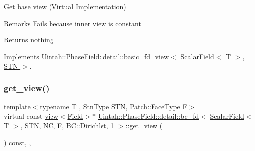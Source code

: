Get base view (Virtual \hyperlink{classUintah_1_1PhaseField_1_1Implementation}{Implementation}) 

\begin{DoxyRemark}{Remarks}
Fails because inner view is constant
\end{DoxyRemark}
\begin{DoxyReturn}{Returns}
nothing 
\end{DoxyReturn}


Implements \hyperlink{classUintah_1_1PhaseField_1_1detail_1_1basic__fd__view_3_01ScalarField_3_01T_01_4_00_01STN_01_4_a2bbf870b332cfd997ec5297428019bc8}{Uintah\+::\+Phase\+Field\+::detail\+::basic\+\_\+fd\+\_\+view$<$ Scalar\+Field$<$ T $>$, S\+T\+N $>$}.

\mbox{\label{classUintah_1_1PhaseField_1_1detail_1_1bc__fd_3_01ScalarField_3_01T_01_4_00_01STN_00_01NC_00_01Fc8a6e28ffa258d282d0a921216b0ed9f_a01b987b37d15d552579788a353ecce2d}} 
\subsubsection{\texorpdfstring{get\+\_\+view()}{get\_view()}\hspace{0.1cm}{\footnotesize\ttfamily [2/2]}}
{\footnotesize\ttfamily template$<$typename T , Stn\+Type S\+TN, Patch\+::\+Face\+Type F$>$ \\
virtual const \hyperlink{classUintah_1_1PhaseField_1_1detail_1_1view}{view}$<$\hyperlink{structUintah_1_1PhaseField_1_1ScalarField}{Field}$>$$\ast$ \hyperlink{classUintah_1_1PhaseField_1_1detail_1_1bc__fd}{Uintah\+::\+Phase\+Field\+::detail\+::bc\+\_\+fd}$<$ \hyperlink{structUintah_1_1PhaseField_1_1ScalarField}{Scalar\+Field}$<$ T $>$, S\+TN, \hyperlink{namespaceUintah_1_1PhaseField_a33d355affda78a83f45755ba8388cedda77924170fe82bfd58b74ca3e44139718}{NC}, F, \hyperlink{namespaceUintah_1_1PhaseField_a148fba372aa3be96fd6eede7a2fa10b5abac152b762896edff34ed668ae1a546f}{B\+C\+::\+Dirichlet}, 1 $>$\+::get\+\_\+view (\begin{DoxyParamCaption}{ }\end{DoxyParamCaption}) const\hspace{0.3cm}{\ttfamily [inline]}, {\ttfamily [override]}, {\ttfamily [virtual]}}



